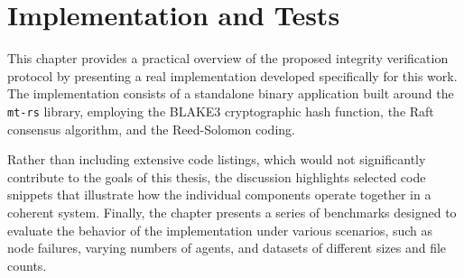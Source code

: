 \chapter{Implementation and Tests}

This chapter provides a practical overview of the proposed integrity
verification protocol by presenting a real implementation developed specifically for this work. The implementation consists of a standalone binary application built around the \texttt{mt-rs} library, employing the BLAKE3 cryptographic hash function, the Raft consensus algorithm, and the Reed-Solomon coding.

Rather than including extensive code listings, which would not significantly contribute to the goals of this thesis, the discussion highlights selected code snippets that illustrate how the individual components operate together in a coherent system. Finally, the chapter presents a series of benchmarks designed to evaluate the behavior of the implementation under various scenarios, such as node failures, varying numbers of agents, and datasets of different sizes and file counts.



